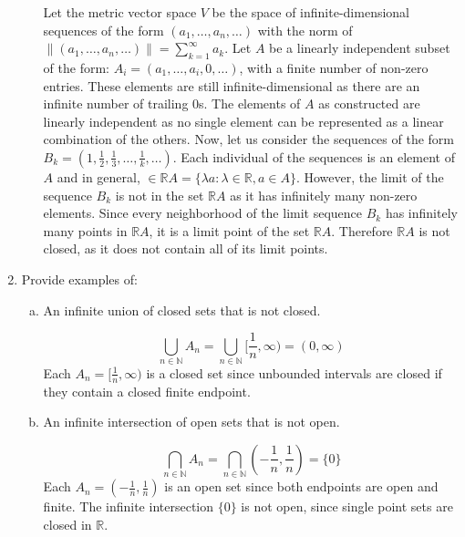 \documentclass[12pt,letterpaper,reqno]{amsart}
\newcommand{\R}{\mathbb R}
\newcommand{\N}{\mathbb N}
\begin{document}
\begin{enumerate}[1.]
\begin{enumerate}[(a)]
\begin{flushleft}
Let the metric vector space $V$ be the space of infinite-dimensional sequences of the form $(a_1, \ldots, a_n, \ldots)$ with the norm of $\|(a_1, \ldots, a_n, \ldots)\| = \sum_{k=1}^\infty a_k$. Let $A$ be a linearly independent subset of the form: $A_i = (a_1, \ldots, a_i, 0, \ldots)$, with a finite number of non-zero entries. These elements are still infinite-dimensional as there are an infinite number of trailing $0$s. The elements of $A$ as constructed are linearly independent as no single element can be represented as a linear combination of the others. Now, let us consider the sequences of the form $B_k = (1, \frac{1}{2}, \frac{1}{3}, \ldots, \frac{1}{k}, \ldots)$. Each individual of the sequences is an element of $A$ and in general, $\in \R A=\{\lambda a : \lambda \in \R, a\in A\}$. However, the limit of the sequence $B_k$ is not in the set $\R A$ as it has infinitely many non-zero elements. Since every neighborhood of the limit sequence $B_k$ has infinitely many points in $\R A$, it is a limit point of the set $\R A$. Therefore $\R A$ is not closed, as it does not contain all of its limit points.
\end{flushleft}
\end{enumerate}
\item Provide examples of:
\begin{enumerate}[(a)]
\item An infinite union of closed sets that is not closed.
\begin{flushleft}
$$\bigcup_{n \in \N} A_n = \bigcup_{n \in \N} [\frac{1}{n},\infty) = (0,\infty)$$
Each $A_n = [\frac{1}{n},\infty)$ is a closed set since unbounded intervals are closed if they contain a closed finite endpoint.
\end{flushleft}
\item An infinite intersection of open sets that is not open.
\begin{flushleft}
$$\bigcap_{n \in \N} A_n = \bigcap_{n \in \N} (-\frac{1}{n},\frac{1}{n}) = \{0\}$$
Each $A_n = (-\frac{1}{n},\frac{1}{n})$ is an open set since both endpoints are open and finite. The infinite intersection $\{0\}$ is not open, since single point sets are closed in $\R$.
\end{flushleft}
\end{enumerate}
\end{enumerate}
\end{document}

